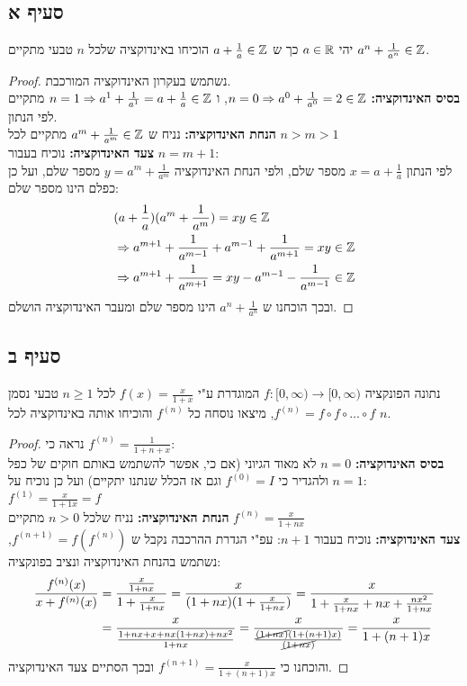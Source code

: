 \documentclass{article}
\begin{document}
	\subsection*{סעיף א}
	יהי $a \in \mathbb{R}$ כך ש $a + \frac{1}{a} \in \mathbb{Z}$ הוכיחו באינדוקציה שלכל $n$ טבעי
	מתקיים $a^n + \frac{1}{a^n} \in \mathbb{Z}$.
	\begin{proof}
		נשתמש בעקרון האינדוקציה המורכבת. \\
		\textbf{בסיס האינדוקציה:} $n=0 \Rightarrow a^0 + \frac{1}{a^0} = 2 \in \mathbb{Z}$, ו
		$n=1 \Rightarrow a^1 + \frac{1}{a^1} = a + \frac{1}{a} \in \mathbb{Z}$ מתקיים לפי הנתון. \\
		\textbf{הנחת האינדוקציה:} נניח ש $a^m + \frac{1}{a^m} \in \mathbb{Z}$ מתקיים לכל $n > m > 1$ \\
		\textbf{צעד האינדוקציה:} נוכיח בעבור $n = m+1$: \\
		לפי הנתון $x = a + \frac{1}{a}$ מספר שלם, ולפי הנחת האינדוקציה $y = a^m + \frac{1}{a^m}$ מספר שלם, ועל כן כפלם הינו מספר שלם:
		\begin{align*}
			&(a + \frac{1}{a})(a^m + \frac{1}{a^m}) = xy \in \mathbb{Z}  \\
			&\Rightarrow
			a^{m+1} + \frac{1}{a^{m-1}} + a^{m-1} + \frac{1}{a^{m+1}} = xy \in \mathbb{Z} \\
			&\Rightarrow
			a^{m+1} + \frac{1}{a^{m+1}} = xy - a^{m-1} - \frac{1}{a^{m-1}} \in \mathbb{Z}
		\end{align*}
		ובכך הוכחנו ש $a^{n} + \frac{1}{a^{n}}$ הינו מספר שלם ומעבר האינדוקציה הושלם.
	\end{proof}

	\subsection*{סעיף ב}
	נתונה הפונקציה $f: [0, \infty) \to [0, \infty)$ המוגדרת ע"י $f(x) = \frac{x}{1+x}$
	לכל $n \geq 1$ טבעי נסמן $f^{(n)}= f \circ f \circ \dots \circ f$,
	מיצאו נוסחה כל $f^{(n)}$ והוכיחו אותה באינדוקציה לכל $n$.
	\begin{proof}
		נראה כי $f^{(n)} = \frac{1}{1 + n+x}$: \\
		\textbf{בסיס האינדוקציה:} $n=0$ לא מאוד הגיוני (אם כי, אפשר להשתמש באותם חוקים של כפל ולהגדיר כי $f^{(0)}=I$ וגם אז הכלל שנתנו יתקיים) ועל כן נוכיח על $n=1$:
		$f^{(1)} = \frac{x}{1+1x} = f$ \\
		\textbf{הנחת האינדוקציה:} נניח שלכל $n > 0$ מתקיים $f^{(n)} = \frac{x}{1 + nx}$ \\
		\textbf{צעד האינדוקציה:} נוכיח בעבור $n+1$:
		עפ"י הגדרת ההרכבה נקבל ש $f^{(n+1)} = f(f^{(n)})$, נשתמש בהנחת האינדוקציה ונציב בפונקציה:
		\begin{align*}
			\frac{f^{(n)}(x)}{x + f^{(n)}(x)} &=
			\frac{\frac{x}{1+nx}}{1+\frac{x}{1+nx}} =
			\frac{x}{(1+nx)(1 + \frac{x}{1 + nx})} =
			\frac{x}{1 + \frac{x}{1+nx} + nx + \frac{nx^2}{1+nx}} \\
			&= \frac{x}{\frac{1 + nx + x + nx(1+nx) + nx^2}{1+nx}} =
			\frac{x}{\frac{\cancel{(1+nx)}(1+(n+1)x)}{\cancel{(1+nx)}}}
			= \frac{x}{1 + (n+1)x}
		\end{align*}
		והוכחנו כי $f^{(n+1)} = \frac{x}{1+(n+1)x}$ ובכך הסתיים צעד האינדוקציה.
	\end{proof}
\end{document}

